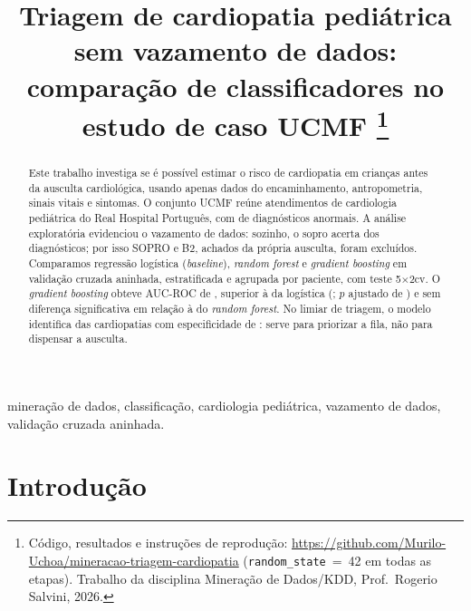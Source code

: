 \documentclass[conference,a4paper]{IEEEtran}
\begin{document}
\title{Triagem de cardiopatia pediátrica sem vazamento de dados: comparação de classificadores no estudo de caso UCMF%
\thanks{Código, resultados e instruções de reprodução: \url{https://github.com/Murilo-Uchoa/mineracao-triagem-cardiopatia} (\texttt{random\_state}~=~42 em todas as etapas). Trabalho da disciplina Mineração de Dados/KDD, Prof.\ Rogerio Salvini, 2026.}}

\author{
}

\maketitle

\begin{abstract}
Este trabalho investiga se é possível estimar o risco de cardiopatia em crianças antes da ausculta cardiológica, usando apenas dados do encaminhamento, antropometria, sinais vitais e sintomas. O conjunto UCMF reúne  atendimentos de cardiologia pediátrica do Real Hospital Português, com  de diagnósticos anormais. A análise exploratória evidenciou o vazamento de dados: sozinho, o sopro acerta  dos diagnósticos; por isso SOPRO e B2, achados da própria ausculta, foram excluídos. Comparamos regressão logística (\textit{baseline}), \textit{random forest} e \textit{gradient boosting} em validação cruzada aninhada, estratificada e agrupada por paciente, com teste 5$\times$2cv. O \textit{gradient boosting} obteve AUC-ROC de , superior à da logística (; $p$ ajustado de ) e sem diferença significativa em relação à do \textit{random forest}. No limiar de triagem, o modelo identifica  das cardiopatias com especificidade de : serve para priorizar a fila, não para dispensar a ausculta.
\end{abstract}

\begin{IEEEkeywords}
mineração de dados, classificação, cardiologia pediátrica, vazamento de dados, validação cruzada aninhada.
\end{IEEEkeywords}

\section{Introdução}
\end{document}
